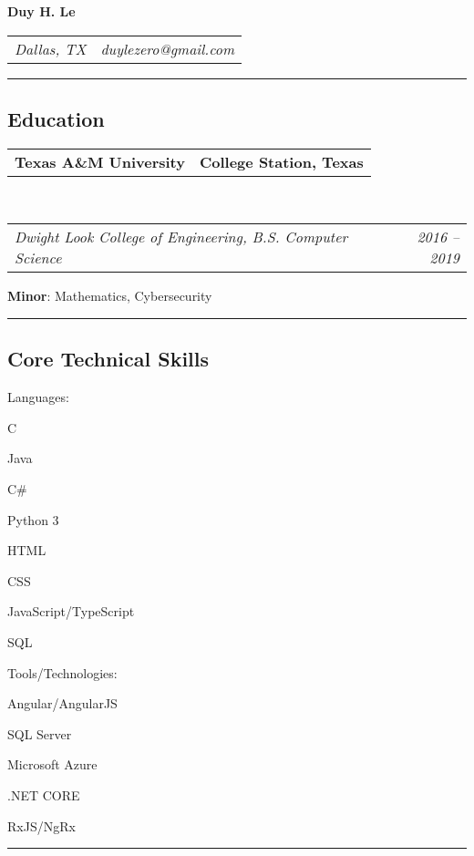 \documentclass[10pt,letterpaper]{article}
\makeatletter
\newenvironment{indentsection}[1]%
{\begin{list}{}%
	{\setlength{\leftmargin}{#1}}%
	\item[]%
}
{\end{list}}
\newcommand{\headerrow}[2]
{\begin{tabular*}{\linewidth}{l@{\extracolsep{\fill}}r}
	#1 &
	#2 \\
\end{tabular*}}
\newcommand{\CPP}
{C\nolinebreak[4]\hspace{-.05em}\raisebox{.22ex}{\footnotesize\bf ++}}
\makeatother
\begin{document}
\begin{center}
{\LARGE \textbf{Duy H. Le}}
\end{center}
	\headerrow
		{\emph{Dallas, TX}}
		{\emph{duylezero@gmail.com}}
\hrule
\vspace{-0.8em}
\subsection*{Education}

	\headerrow
		{\textbf{Texas A\&M University}}
		{\textbf{College Station, Texas}}
	\\
	\headerrow
		{\emph{Dwight Look College of Engineering, B.S. Computer Science}}
		{\emph{2016 -- 2019}}
	\vspace{-0.4em}
		 \textbf{Minor}: Mathematics, Cybersecurity \\

\hrule
\vspace{-0.8em}
\subsection*{Core Technical Skills}
\vspace{-0.4em}
\begin{indentsection}{\parindent}
\begin{description*}
	\item[Languages:]
	\begin{inparaitem}[\ * \ ]
 		\CPP \ 
		\item Java
		\item C\#
		\item Python 3
		\item HTML
		\item CSS
		\item JavaScript/TypeScript
		\item SQL
	\end{inparaitem}
	\item[Tools/Technologies:]
		\begin{inparaitem}[\ * \ ]
 		 Angular/AngularJS
		\item SQL Server
		\item Microsoft Azure
		\item .NET CORE
		\item RxJS/NgRx
	\end{inparaitem}
\end{description*}
\end{indentsection}

\hrule
\vspace{-0.8em}
\end{document}
